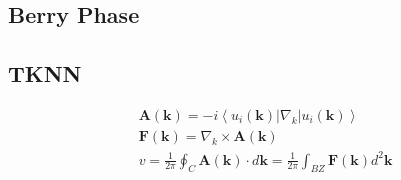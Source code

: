 \subsection{\label{ssec:berry}Berry Phase}

\subsection{\label{ssec:tknn}TKNN}

\begin{align}
    & \mathbf{A}(\mathbf{k})=-i\left\langle u_{i}(\mathbf{k})\left|\nabla_{k}\right| u_{i}(\mathbf{k})\right\rangle \\
    &  \mathbf{F}(\mathbf{k})=\nabla_{k} \times \mathbf{A}(\mathbf{k}) \\
    & v=\frac{1}{2 \pi} \oint_{C} \mathbf{A}(\mathbf{k}) \cdot d \mathbf{k}=\frac{1}{2 \pi} \int_{B Z} \mathbf{F}(\mathbf{k}) d^{2} \mathbf{k}
\end{align}
